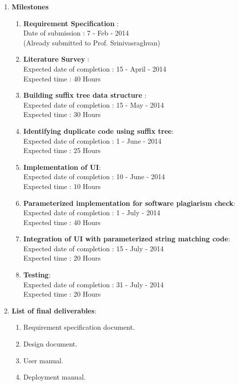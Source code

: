 \documentclass[11pt]{article}
\begin{document}
\begin{enumerate}
  \item \textbf{Milestones}
  \begin{enumerate}
    \item \textbf{Requirement Specification} :  \\
    Date of submission : 7 - Feb - 2014 \\ 
    (Already submitted to Prof. Srinivasraghvan)\\
    \item \textbf{Literature Survey} : \\
Expected date of completion : 15 - April - 2014 \\ 
Expected time : 40 Hours\\
    \item \textbf{Building suffix tree data structure} :\\
    Expected date of completion : 15 - May - 2014 \\ 
    Expected time : 30 Hours\\
    \item \textbf{Identifying duplicate code using suffix tree}: \\
    Expected date of completion : 1 - June - 2014 \\ 
    Expected time : 25 Hours\\
    \item \textbf{Implementation of UI}: \\
    Expected date of completion : 10 - June - 2014 \\ 
    Expected time : 10 Hours\\
    \item \textbf{Parameterized implementation for software plagiarism check}:\\
    Expected date of completion : 1 - July - 2014 \\ 
    Expected time : 40 Hours\\
    \item \textbf{Integration of UI with parameterized string matching code}:\\
    Expected date of completion : 15 - July - 2014 \\ 
    Expected time : 20 Hours\\
    \item \textbf{Testing}:\\
    Expected date of completion : 31 - July - 2014 \\ 
    Expected time : 20 Hours\\
           
  \end{enumerate}
  \item \textbf{List of final deliverables}:
    \begin{enumerate}
  \item Requirement specification document.
  \item Design document.
  \item User manual.
  \item Deployment manual.
    \end{enumerate}

\end{enumerate}
\end{document}
